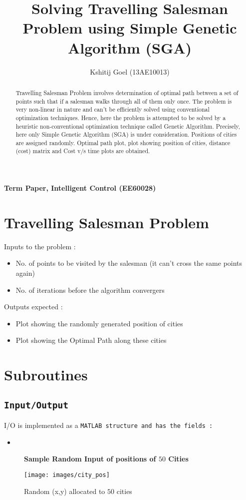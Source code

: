 \documentclass[]{article}
\title{Solving Travelling Salesman Problem using Simple Genetic Algorithm (SGA)}
\author{Kshitij Goel (13AE10013)}
\begin{document}
\maketitle
\begin{center}
\centering
\textbf{Term Paper, Intelligent Control (EE60028)}
\end{center}
\begin{abstract}
Travelling Salesman Problem involves determination of optimal path between a set of points such that if a salesman walks through all of them only once.
The problem is very non-linear in nature and can't be efficiently solved using conventional optimization techniques. Hence, here the problem is attempted
to be solved by a heuristic non-conventional optimization technique called Genetic Algorithm. Precisely, here only Simple Genetic Algorithm (SGA) is under consideration.
Positions of cities are assigned randomly. Optimal path plot, plot showing position of  cities, distance (cost) matrix and Cost v/s time plots are obtained. 
\end{abstract}

\section{Travelling Salesman Problem}
Inputs to the problem :
\begin{itemize}
\item{No. of points to be visited by the salesman (it can't cross the same points again)} 
\item{No. of iterations before the algorithm convergers}
\end{itemize}
Outputs expected :
\begin{itemize}
\item{Plot showing the randomly generated position of cities}
\item{Plot showing the Optimal Path along these cities}
\end{itemize}
\section{Subroutines}
\subsection{\tt{Input/Output}}
I/O is implemented as a \tt{MATLAB} structure and has the fields :
\begin{itemize}
\item 
\end{itemize}
\begin{figure}
\centering
\textbf{Sample Random Input of positions of $50$ Cities}\par \medskip
\texttt{[image: images/city\_pos]}
\caption{Random (x,y) allocated to $50$ cities}
\end{figure}
\end{document}

